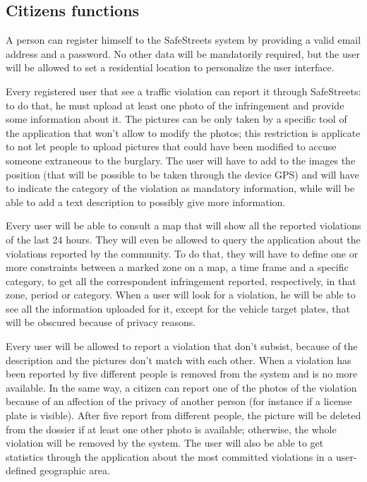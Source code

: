 \documentclass[../RASD.tex]{subfiles}
\begin{document}
    \subsection{Citizens functions}\label{subsec:citizen-functions}
    A person can register himself to the SafeStreets system by providing a valid email address and a password. No other data will be mandatorily required, but the user will be allowed to set a residential location to personalize the user interface.

    Every registered user that see a traffic violation can report it through SafeStreets: to do that, he must upload at least one photo of the infringement and provide some information about it. The pictures can be only taken by a specific tool of the application that won't allow to modify the photos; this restriction is applicate to not let people to upload pictures that could have been modified to accuse someone extraneous to the burglary. The user will have to add to the images the position (that will be possible to be taken through the device GPS) and will have to indicate the category of the violation as mandatory information, while will be able to add a text description to possibly give more information.

    Every user will be able to consult a map that will show all the reported violations of the last 24 hours.
    They will even be allowed to query the application about the violations reported by the community.
    To do that, they will have to define one or more constraints between a marked zone on a map, a time frame and a specific category, to get all the correspondent infringement reported, respectively, in that zone, period or category. When a user will look for a violation, he will be able to see all the information uploaded for it, except for the vehicle target plates, that will be obscured because of privacy reasons.

    Every user will be allowed to report a violation that don’t subsist, because of the description and the pictures don’t match with each other.
    When a violation has been reported by five different people is removed from the system and is no more available.
    In the same way, a citizen can report one of the photos of the violation because of an affection of the privacy of another person
    (for instance if a license plate is visible).
    After five report from different people, the picture will be deleted from the dossier if at least one other photo is available;
    otherwise, the whole violation will be removed by the system.
    The user will also be able to get statistics through the application about the most committed violations in a user-defined geographic area.
\end{document}
